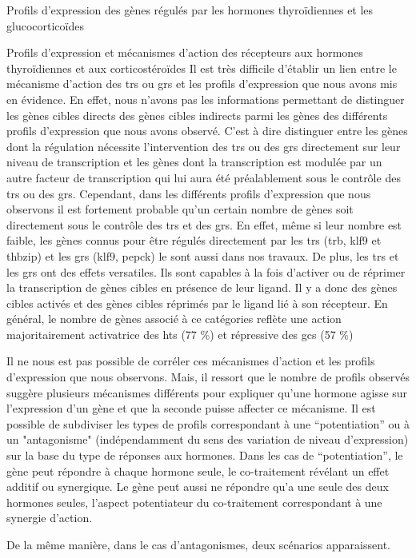 \documentclass[../main.tex]{subfiles}
\begin{document}
\begin{chapter}{Profils d'expression des gènes régulés par les hormones thyroïdiennes et les glucocorticoïdes}
\begin{section}{Profils d'expression et mécanismes d'action des récepteurs aux hormones thyroïdiennes et aux corticostéroïdes}
Il est très difficile d'établir un lien entre le mécanisme d'action des \glspl{tr} ou \glspl{gr} et les profils d'expression que nous avons mis en évidence.
En effet, nous n'avons pas les informations permettant de distinguer les gènes cibles directs des gènes cibles indirects parmi les gènes des différents profils d'expression que nous avons observé.
C'est à dire distinguer entre les gènes dont la régulation nécessite l'intervention des \glspl{tr} ou des \glspl{gr} directement sur leur niveau de transcription et les gènes dont la transcription est modulée par un autre facteur de transcription qui lui aura été préalablement sous le contrôle des \glspl{tr} ou des \glspl{gr}.
Cependant, dans les différents profils d'expression que nous observons il est fortement probable qu'un certain nombre de gènes soit directement sous le contrôle des \glspl{tr} et des \glspl{gr}.
En effet, même si leur nombre est faible, les gènes connus pour être régulés directement par les \glspl{tr} (\gls{trb}, \gls{klf9} et \gls{thbzip}) et les \glspl{gr} (\gls{klf9}, \gls{pepck}) le sont aussi dans nos travaux.
De plus, les \glspl{tr} et les \glspl{gr} ont des effets versatiles.
Ils sont capables à la fois d'activer ou de réprimer la transcription de gènes cibles en présence de leur ligand.
Il y a donc des gènes cibles activés et des gènes cibles réprimés par le ligand lié à son récepteur.
En général, le nombre de gènes associé à ce catégories reflète une action majoritairement activatrice des \glspl{ht} (77 \%) et répressive des \glspl{gc} (57 \%) 
\par
Il ne nous est pas possible de corréler ces mécanismes d'action et les profils d'expression que nous observons.
Mais, il ressort que le nombre de profils observés suggère plusieurs mécanismes différents pour expliquer qu'une hormone agisse sur l'expression d'un gène et que la seconde puisse affecter ce mécanisme.
Il est possible de subdiviser les types de profils correspondant à une ``potentiation'' ou à un "antagonisme" (indépendamment du sens des variation de niveau d'expression) sur la base du type de réponses aux hormones.
Dans les cas de ``potentiation'', le gène peut répondre à chaque hormone seule, le co-traitement révélant un effet additif ou synergique.
Le gène peut aussi ne répondre qu'a une seule des deux hormones seules, l'aspect potentiateur du co-traitement correspondant à une synergie d'action.
\par
De la même manière, dans le cas d'antagonismes, deux scénarios apparaissent.
\begin{itemize}

\end{itemize}
\end{section}
\end{chapter}
\end{document}
